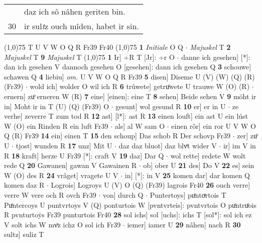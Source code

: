 \documentclass[8pt,a4paper,notitlepage]{article}
\begin{document}
\begin{table}[ht]
\begin{minipage}[t]{0.5\linewidth}
\begin{tabular}{rl}
 & daz ich sô nâhen geriten bin.\\ 
30 & ir sul\textit{t}z ouch mîden, habet ir sin.\\ 
\end{tabular}
\scriptsize
\line(1,0){75} \newline
T U V W O Q R Fr39 Fr40 \newline
\line(1,0){75} \newline
\textbf{1} \textit{Initiale} O Q   $\cdot$ \textit{Majuskel} T  \textbf{2} \textit{Majuskel} T  \textbf{9} \textit{Majuskel} T  \newline
\line(1,0){75} \newline
\textbf{1} Ir] ÷R T [Jr]: ÷r O  $\cdot$ danne ich gesehen] [*]: dan ich gesehen V dannoch gesehen O [gesehen]: dann ich gesehen Q \textbf{3} schouwe] schawen Q \textbf{4} liebiu] \textit{om.} U V W O Q R Fr39 \textbf{5} disen] Diseme U (V) (W) (Q) (R) (Fr39)  $\cdot$ wold ich] wolder O wil ich R \textbf{6} trûwete] getruͦwete U trauwe W (O) (R)  $\cdot$ ernern] zuͦ erneren W (R) \textbf{7} eine] [einen]: eine T \textbf{8} sehen] Beide sehen V \textbf{9} möht ir in] Moht ir in T (U) (Q) (Fr39) O  $\cdot$ gesunt] wol gesund R \textbf{10} er] er in U  $\cdot$ ze verhe] zeverre T zum tod R \textbf{12} ast] [l*]: ast R \textbf{13} einen louft] ein ast U ein lúst W (O) ein Rinden R ein luft Fr39  $\cdot$ als] al W sam O  $\cdot$ einen rôr] ein ror U V W O Q (R) Fr39 \textbf{14} ein] einen T \textbf{15} den schoup] Das schob R Der schovp Fr39  $\cdot$ zer] zuͦ U  $\cdot$ tjost] wunden R \textbf{17} unz] Mit U  $\cdot$ daz daz bluot] daz blvͦt wider V  $\cdot$ ir] im V in R \textbf{18} kraft] herze U Fr39 [*]: craft V \textbf{19} daz] Dar Q  $\cdot$ wol rette] redete W wolt rede Q \textbf{20} Gawanen] gawan V Gawainen R  $\cdot$ ob] ober U \textbf{21} des] Do V \textbf{22} es] sein W (O) des R \textbf{24} vrâget] vragete U V  $\cdot$ in] [*]: in V \textbf{25} komen dar] dar komen Q komen daz R  $\cdot$ Logrois] Logroys U (V) O (Q) (Fr39) lagrois Fr40 \textbf{26} ouch verre] verre W vere och R ovch Fr39  $\cdot$ von] durch Q  $\cdot$ Puntertoys] puͦntoͮrtois T Puͦntercoys U puntvrtoys V (Q) ponturtois W [pvntvrteis]: pvntvrtois O puͦntruͦois R pvnturtoẏs Fr39 punturtois Fr40 \textbf{28} sol ichs] sol [uchs]: ichs T [sol*]: sol ich ez V solt ichs W mvͦz ichz O sol ich Fr39  $\cdot$ iemer] iamer U \textbf{29} nâhen] nach R \textbf{30} sultz] suliz T \newline
\end{minipage}
\end{table}
\end{document}
